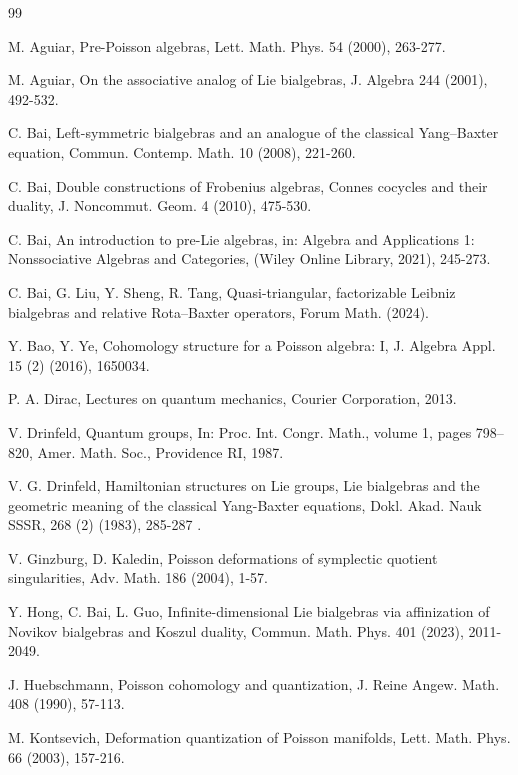 \documentclass[12pt]{amsart}
\theoremstyle{definition}
\begin{document}
\begin{thebibliography} {99}

 M. Aguiar, Pre-Poisson algebras, Lett. Math. Phys. 54 (2000), 263-277.

 M. Aguiar, On the associative analog of Lie bialgebras, J. Algebra 244 (2001), 492-532.
	 
 C. Bai, Left-symmetric bialgebras and an analogue of the classical Yang–Baxter equation, Commun. Contemp.
Math. 10 (2008), 221-260.

 C. Bai, Double constructions of Frobenius algebras, Connes cocycles and their duality, J. Noncommut. Geom. 4 (2010), 475-530.

 C. Bai, An introduction to pre-Lie algebras, in: Algebra and Applications 1:
 Nonssociative Algebras and Categories, (Wiley Online Library, 2021), 245-273.
 
  C. Bai, G. Liu, Y. Sheng, R. Tang, Quasi-triangular, factorizable Leibniz
bialgebras and relative Rota–Baxter operators, Forum Math. (2024).

 Y. Bao, Y. Ye, Cohomology structure for a Poisson algebra: I, J. Algebra Appl. 15 (2) (2016), 1650034.
 
  P. A. Dirac, Lectures on quantum mechanics, Courier Corporation, 2013.
  
   V. Drinfeld, Quantum groups, In: Proc. Int. Congr. Math., volume 1, pages 798–820, Amer. Math. Soc., Providence
RI, 1987.

 V. G. Drinfeld, Hamiltonian structures on Lie groups, Lie bialgebras and the geometric meaning of the classical
Yang-Baxter equations, Dokl. Akad. Nauk SSSR, 268 (2) (1983), 285-287 .


 V. Ginzburg, D. Kaledin, Poisson deformations of symplectic quotient singularities, Adv. Math. 186 (2004), 1-57.

 Y. Hong, C. Bai, L. Guo, Infinite-dimensional Lie bialgebras via affinization of Novikov
bialgebras and Koszul duality, Commun. Math. Phys. 401 (2023), 2011-2049.

 J. Huebschmann, Poisson cohomology and quantization, J. Reine Angew. Math. 408 (1990), 57-113.
  
  M. Kontsevich, Deformation quantization of Poisson manifolds, Lett. Math. Phys. 66 (2003), 157-216.
 

\end{thebibliography}
\end{document}
